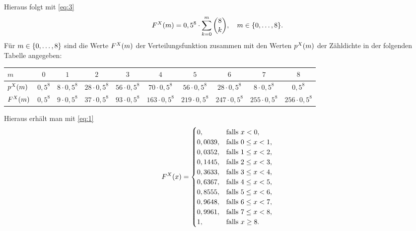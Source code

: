 \documentclass{exercise}
\begin{document}
\begin{enumerate}
\[        \]
        Hieraus folgt mit \eqref{eq:3}
        \[
            F^X\parentheses*{m} = 0,5^8 \cdot \sum_{k = 0}^m \binom{8}{k}, \quad m \in \braces*{0, \ldots, 8}.
        \]
        Für \(m \in \braces*{0, \ldots, 8}\) sind die Werte \(F^X\parentheses*{m}\) der Verteilungsfunktion zusammen mit den Werten \(p^X\parentheses*{m}\) der Zähldichte in der folgenden Tabelle angegeben:
        \begin{center}
            \begin{tabular}{lccccccccc}
                \toprule
                \(m\) & \(0\) & \(1\) & \(2\) & \(3\) & \(4\) & \(5\) & \(6\) & \(7\) & \(8\)\\
                \midrule
                \(p^X\parentheses*{m}\) & \(0,5^8\) & \(8 \cdot 0,5^8\) & \(28 \cdot 0,5^8\) & \(56 \cdot 0,5^8\) & \(70 \cdot 0,5^8\) & \(56 \cdot 0,5^8\) & \(28 \cdot 0,5^8\) & \(8 \cdot 0,5^8\) & \(0,5^8\)\\
                \(F^X\parentheses*{m}\) & \(0,5^8\) & \(9 \cdot 0,5^8\) & \(37 \cdot 0,5^8\) & \(93 \cdot 0,5^8\) & \(163 \cdot 0,5^8\) & \(219 \cdot 0,5^8\) & \(247 \cdot 0,5^8\) & \(255 \cdot 0,5^8\) & \(256 \cdot 0,5^8\)\\
                \bottomrule
            \end{tabular}
        \end{center}
        Hieraus erhält man mit \eqref{eq:1}
        \[
            F^X\parentheses*{x} = \begin{cases}
                0, & \text{falls }x < 0,\\
                0,0039, & \text{falls }0 \le x < 1,\\
                0,0352, & \text{falls }1 \le x < 2,\\
                0,1445, & \text{falls }2 \le x < 3,\\
                0,3633, & \text{falls }3 \le x < 4,\\
                0,6367, & \text{falls }4 \le x < 5,\\
                0,8555, & \text{falls }5 \le x < 6,\\
                0,9648, & \text{falls }6 \le x < 7,\\
                0,9961, & \text{falls }7 \le x < 8,\\
                1, & \text{falls }x \ge 8.
            \end{cases}
        \]
        \begin{center}
            \begin{tikzpicture}

\end{tikzpicture}
\end{center}
\end{enumerate}
\end{document}
